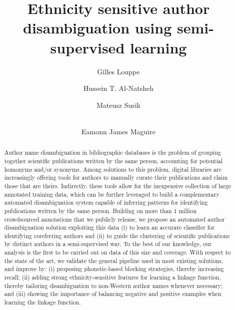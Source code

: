 \documentclass[runningheads,a4paper]{llncs}
\begin{document}
\title{Ethnicity sensitive author disambiguation using semi-supervised learning}

\author{Gilles Louppe\and Hussein T. Al-Natsheh\and Mateusz Susik\and\\ 
Eamonn James Maguire}



\maketitle
\begin{abstract}

Author name disambiguation in bibliographic databases is the problem of grouping
together scientific publications written by the same person, accounting for
potential homonyms and/or synonyms. Among solutions to this problem, digital
libraries are increasingly offering tools for authors to manually curate their
publications and claim those that are theirs. Indirectly, these tools allow for
the inexpensive collection of large annotated training data, which can be
further leveraged to build a complementary automated disambiguation system
capable of inferring patterns for identifying publications written by the same
person. Building on more than 1 million crowdsourced
annotations that we publicly release, we propose an automated author disambiguation solution exploiting
this data (i) to learn an accurate classifier for identifying coreferring
authors and (ii) to guide the clustering of scientific publications by distinct
authors in a semi-supervised way. To the best of our knowledge, our analysis is
the first to be carried out on data of this size and coverage. With respect to
the state of the art, we validate the general pipeline used in most existing
solutions, and improve by: (i) proposing phonetic-based blocking strategies,
thereby increasing recall; (ii) adding strong ethnicity-sensitive features for
learning a linkage function, thereby tailoring disambiguation to non-Western
author names whenever necessary; and (iii) showing the importance of balancing
negative and positive examples when learning the linkage function.

\end{abstract}
\end{document}
